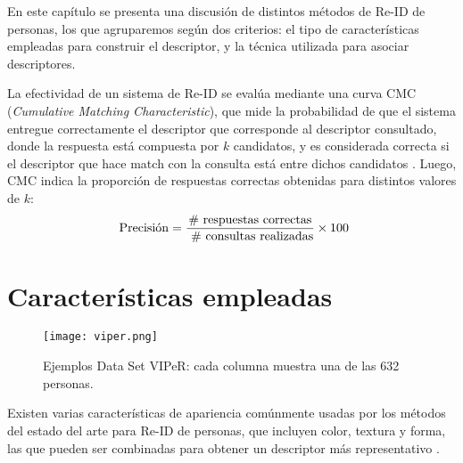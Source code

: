 \documentclass[../memoria.tex]{subfiles}
\begin{document}
\label{trabajo relacionado}

En este capítulo se presenta una discusión de distintos métodos de Re-ID de personas, los que agruparemos según dos criterios: el tipo de características empleadas para construir el descriptor, y la técnica utilizada para asociar descriptores. 


La efectividad de un sistema de Re-ID se evalúa mediante una curva CMC (\emph{Cumulative Matching Characteristic}), que mide la probabilidad de que el sistema entregue correctamente el descriptor que corresponde al descriptor consultado, donde la respuesta está compuesta por $k$ candidatos, y es considerada correcta si el descriptor que hace match con la consulta está entre dichos candidatos \cite{decann2012can}. Luego, CMC indica la proporción de respuestas correctas obtenidas para distintos valores de $k$:$${\rm\ Precisi\acute{o}n} = \frac{{\rm \#\ respuestas\ correctas}}{{\rm\ \#\ consultas\ realizadas}}\times 100$$

\section{Características empleadas}
\begin{figure}
  \centering
  \texttt{[image: viper.png]}
  \caption{Ejemplos Data Set VIPeR: cada columna muestra una de las 632 personas.}
  \label{fig:viper}
\end{figure}
Existen varias características de apariencia comúnmente usadas por los métodos del estado del arte para Re-ID de personas, que incluyen color, textura y forma, las que pueden ser combinadas para obtener un descriptor más representativo \cite{mazzon2012person}. 
\end{document}
